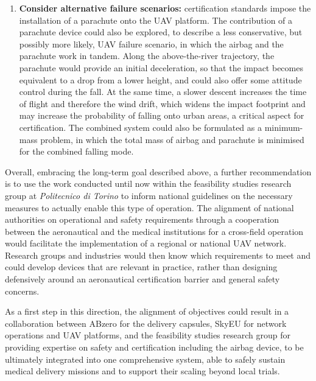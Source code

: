 \begin{enumerate}
    \item \textbf{Consider alternative failure scenarios:} certification standards impose the installation of a parachute onto the UAV platform. The contribution of a parachute device could also be explored, to describe a less conservative, but possibly more likely, UAV failure scenario, in which the airbag and the parachute work in tandem. Along the above-the-river trajectory, the parachute would provide an initial deceleration, so that the impact becomes equivalent to a drop from a lower height, and could also offer some attitude control during the fall. At the same time, a slower descent increases the time of flight and therefore the wind drift, which widens the impact footprint and may increase the probability of falling onto urban areas, a critical aspect for certification. The combined system could also be formulated as a minimum-mass problem, in which the total mass of airbag and parachute is minimised for the combined falling mode.
\end{enumerate}

Overall, embracing the long-term goal described above, a further recommendation is to use the work conducted until now within the feasibility studies research group at \textit{Politecnico di Torino} to inform national guidelines on the necessary measures to actually enable this type of operation. The alignment of national authorities on operational and safety requirements through a cooperation between the aeronautical and the medical institutions for a cross-field operation would facilitate the implementation of a regional or national UAV network. Research groups and industries would then know which requirements to meet and could develop devices that are relevant in practice, rather than designing defensively around an aeronautical certification barrier and general safety concerns.

As a first step in this direction, the alignment of objectives could result in a collaboration between ABzero for the delivery capsules, SkyEU for network operations and UAV platforms, and the feasibility studies research group for providing expertise on safety and certification including the airbag device, to be ultimately integrated into one comprehensive system, able to safely sustain medical delivery missions and to support their scaling beyond local trials.